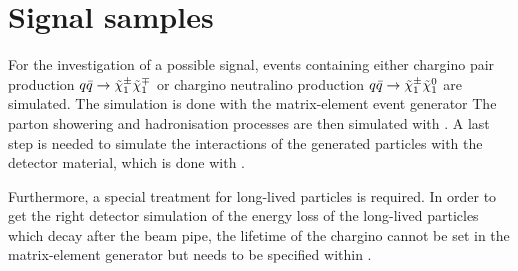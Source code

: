 
\section{Signal samples}
\label{sec:SignalSamples}
For the investigation of a possible signal, events containing either chargino pair production $q\bar{q} \rightarrow \tilde{\chi}^{\pm}_{1} \tilde{\chi}^{\mp}_{1}$ or chargino neutralino production $q\bar{q} \rightarrow \tilde{\chi}^{\pm}_{1} \tilde{\chi}^{0}_{1}$ are simulated. 
The simulation is done with the matrix-element event generator \madgraph \cite{bib:Madgraph_2014}
The parton showering and hadronisation processes are then simulated with \pythia \cite{bib:Pyhtia6_2006}.
A last step is needed to simulate the interactions of the generated particles with the detector material, which is done with \geant \cite{bib:Geant4_2003,bib:Geant4_2006}.

Furthermore, a special treatment for long-lived particles is required.
In order to get the right detector simulation of the energy loss of the long-lived particles which decay after the beam pipe, the lifetime of the chargino cannot be set in the matrix-element generator but needs to be specified within \geant.


